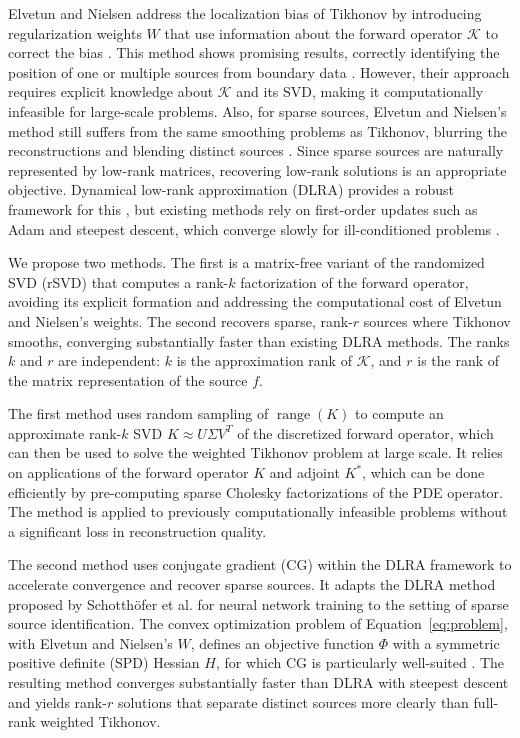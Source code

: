Elvetun and Nielsen address the localization bias of Tikhonov by introducing regularization weights $W$ that use information about the forward operator $\mathcal{K}$ to correct the bias \cite{elvetunRegularizationOperatorSource2020}. This method shows promising results, correctly identifying the position of one or multiple sources from boundary data \cite{elvetunRegularizationOperatorSource2020,elvetunModifiedTikhonovRegularization2020}. However, their approach requires explicit knowledge about $\mathcal{K}$ and its SVD, making it computationally infeasible for large-scale problems. Also, for sparse sources, Elvetun and Nielsen's method still suffers from the same smoothing problems as Tikhonov, blurring the reconstructions and blending distinct sources \cite{elvetunModifiedTikhonovRegularization2020}. 
Since sparse sources are naturally represented by low-rank matrices, recovering low-rank solutions is an appropriate objective. Dynamical low-rank approximation (DLRA) provides a robust framework for this \cite{schotthoferLowrankLotteryTickets2022}, but existing methods rely on first-order updates such as Adam \cite{kingmaAdamMethodStochastic2017} and steepest descent, which converge slowly for ill-conditioned problems \cite{chong2023introduction,hansen2010discrete,nocedal2006numerical}.

We propose two methods. The first is a matrix-free variant of the randomized SVD (rSVD) that computes a rank-$k$ factorization of the forward operator, avoiding its explicit formation and addressing the computational cost of Elvetun and Nielsen's 
weights. The second recovers sparse, rank-$r$ sources where Tikhonov smooths, converging substantially faster than existing DLRA methods. The ranks $k$ and $r$ are independent: $k$ is the approximation rank of $\mathcal{K}$, and $r$ is the rank of the matrix representation of the source $f$.

The first method uses random sampling of $\operatorname{range}(K)$ to compute an approximate rank-$k$ SVD $K \approx U \Sigma V^T$ of the discretized forward operator, which can then be used to solve the weighted Tikhonov problem at large scale. It relies on applications of the forward operator $K$ and adjoint $K^*$, which can be done efficiently by pre-computing sparse Cholesky factorizations of the PDE operator. The method is applied to previously computationally infeasible problems without a significant loss in reconstruction quality.

The second method uses conjugate gradient (CG) within the DLRA framework to accelerate convergence and recover sparse sources. It adapts the DLRA method proposed by Schotthöfer et al. for neural network training \cite{schotthoferLowrankLotteryTickets2022} to the setting of sparse source identification. The convex optimization problem of Equation~\eqref{eq:problem}, with Elvetun and Nielsen's $W$, defines an objective function $\Phi$ with a symmetric positive definite (SPD) Hessian $H$, for which CG is particularly well-suited \cite{hestenesMethodsConjugateGradients1952,fletcherFunctionMinimizationConjugate1964}. The resulting method converges substantially faster than DLRA with steepest descent and yields rank-$r$ solutions that separate distinct sources more clearly than full-rank weighted Tikhonov.

